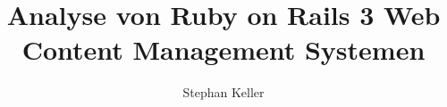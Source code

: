 \title{Analyse von Ruby on Rails 3 Web Content Management Systemen}
\author{Stephan Keller}
\subject{Diplomarbeit}
\publishers{Hochschule für Technik, Wirtschaft und Kultur Leipzig (FH)}
\dedication{Dank an \\ Professor Dr. Ing. Robert Müller, meine Eltern Uta und Uwe Keller sowie meinem Bruder Michael Keller}
\maketitle

\begin{comment}

\begin{titlepage}
\centric
\vspace{4em}
\center
\Large{\textsf{Diplomarbeit zum Thema}}
\vspace{1em}

\Huge{\textsf{''Analyse von Ruby on Rails 3 Web Content Management Systemen''}}
\vspace{2em}
\\
\Large{
	\textsf{
		zur Erlangung des akademischen Gerades\\
		\textbf{Diplom-Medientechniker(FH)}
		\vspace{2em}
		\\
		vorgelegt dem\\
		Fachbereich Medien der Hochschule für Technik, Wirtschaft und Kultur Leipzig (FH)
		}
	}
\vspace{2em}
\\
\Large{
	\textsf{
		Stephan Keller
		\today
		\vspace{2em}
		\\
		Referent: Prof. Dr. Ing. Robert Müller\\
	}
}
%
\end{titlepage}
\end{comment}

